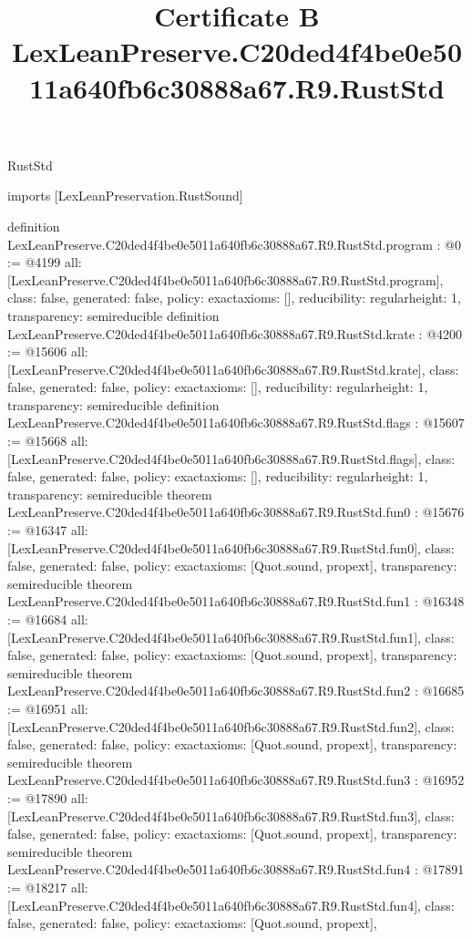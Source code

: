 \begin{lexlean}{RustStd}
\title{Certificate B LexLeanPreserve.C20ded4f4be0e5011a640fb6c30888a67.R9.RustStd}
\begin{coremodule}
imports [LexLeanPreservation.RustSound]

definition LexLeanPreserve.C20ded4f4be0e5011a640fb6c30888a67.R9.RustStd.program : @0 := @4199 {
  all: [LexLeanPreserve.C20ded4f4be0e5011a640fb6c30888a67.R9.RustStd.program],
  class: false,
  generated: false,
  policy: exact{axioms: []},
  reducibility: regular{height: 1},
  transparency: semireducible
}
definition LexLeanPreserve.C20ded4f4be0e5011a640fb6c30888a67.R9.RustStd.krate : @4200 := @15606 {
  all: [LexLeanPreserve.C20ded4f4be0e5011a640fb6c30888a67.R9.RustStd.krate],
  class: false,
  generated: false,
  policy: exact{axioms: []},
  reducibility: regular{height: 1},
  transparency: semireducible
}
definition LexLeanPreserve.C20ded4f4be0e5011a640fb6c30888a67.R9.RustStd.flags : @15607 := @15668 {
  all: [LexLeanPreserve.C20ded4f4be0e5011a640fb6c30888a67.R9.RustStd.flags],
  class: false,
  generated: false,
  policy: exact{axioms: []},
  reducibility: regular{height: 1},
  transparency: semireducible
}
theorem LexLeanPreserve.C20ded4f4be0e5011a640fb6c30888a67.R9.RustStd.fun0 : @15676 := @16347 {
  all: [LexLeanPreserve.C20ded4f4be0e5011a640fb6c30888a67.R9.RustStd.fun0],
  class: false,
  generated: false,
  policy: exact{axioms: [Quot.sound, propext]},
  transparency: semireducible
}
theorem LexLeanPreserve.C20ded4f4be0e5011a640fb6c30888a67.R9.RustStd.fun1 : @16348 := @16684 {
  all: [LexLeanPreserve.C20ded4f4be0e5011a640fb6c30888a67.R9.RustStd.fun1],
  class: false,
  generated: false,
  policy: exact{axioms: [Quot.sound, propext]},
  transparency: semireducible
}
theorem LexLeanPreserve.C20ded4f4be0e5011a640fb6c30888a67.R9.RustStd.fun2 : @16685 := @16951 {
  all: [LexLeanPreserve.C20ded4f4be0e5011a640fb6c30888a67.R9.RustStd.fun2],
  class: false,
  generated: false,
  policy: exact{axioms: [Quot.sound, propext]},
  transparency: semireducible
}
theorem LexLeanPreserve.C20ded4f4be0e5011a640fb6c30888a67.R9.RustStd.fun3 : @16952 := @17890 {
  all: [LexLeanPreserve.C20ded4f4be0e5011a640fb6c30888a67.R9.RustStd.fun3],
  class: false,
  generated: false,
  policy: exact{axioms: [Quot.sound, propext]},
  transparency: semireducible
}
theorem LexLeanPreserve.C20ded4f4be0e5011a640fb6c30888a67.R9.RustStd.fun4 : @17891 := @18217 {
  all: [LexLeanPreserve.C20ded4f4be0e5011a640fb6c30888a67.R9.RustStd.fun4],
  class: false,
  generated: false,
  policy: exact{axioms: [Quot.sound, propext]},
}
\end{coremodule}
\end{lexlean}
